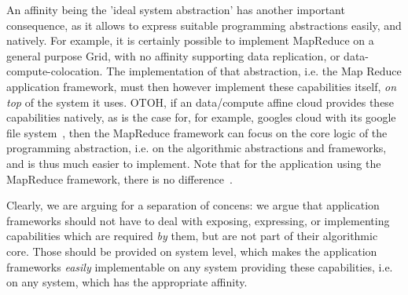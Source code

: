 \documentclass{article}
\newcommand{\I}[1]{\textit{#1}}
\begin{document}

  An affinity being the 'ideal system abstraction' has another
  important consequence, as it allows to express suitable programming
  abstractions easily, and natively.  For example, it is certainly
  possible to implement MapReduce on a general purpose Grid, with no
  affinity supporting data replication, or data-compute-colocation.
  The implementation of that abstraction, i.e. the Map Reduce
  application framework, must then however implement these
  capabilities itself, \I{on top} of the system it uses.  OTOH, if an
  data/compute affine cloud provides these capabilities natively, as
  is the case for, for example, googles cloud with its google file
  system~\cite{gfs}, then the MapReduce framework can focus on the
  core logic of the programming abstraction, i.e. on the algorithmic
  abstractions and frameworks, and is thus much easier to implement.
  Note that for the application using the MapReduce framework, there
  is no difference~\cite{gsoc-saga}.

  Clearly, we are arguing for a separation of concens:  we argue that
  application frameworks should not have to deal with exposing,
  expressing, or implementing capabilities which are required \I{by}
  them, but are not part of their algorithmic core.  Those should be
  provided on system level, which makes the application frameworks
  \I{easily} implementable on any system providing these capabilities,
  i.e. on any system, which has the appropriate affinity.
\end{document}
